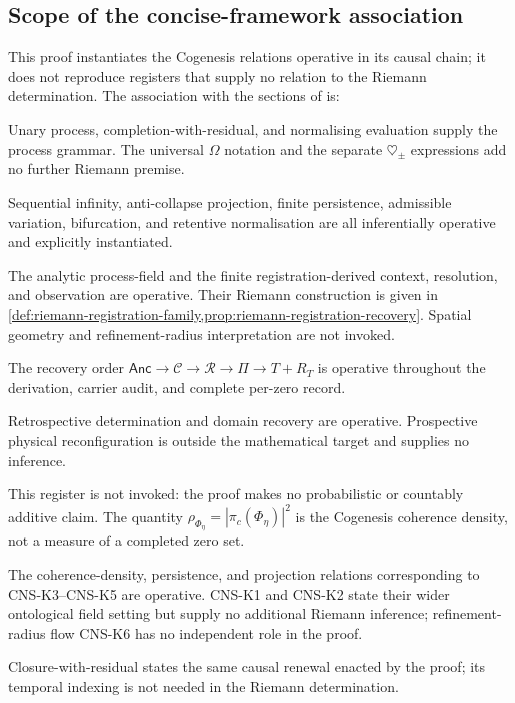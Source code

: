 \documentclass[11pt,a4paper]{article}
\theoremstyle{definition}
\newcommand{\Cctx}{\mathcal{C}}
\newcommand{\Rres}{\mathcal{R}}
\begin{document}
\subsection{Scope of the concise-framework association}
\label{sec:concise-framework-scope}

This proof instantiates the Cogenesis relations operative in its causal chain;
it does not reproduce registers that supply no relation to the Riemann
determination. The association with the sections of
\textcite{petrik2026concise} is:
\begin{description}[leftmargin=0pt,labelindent=0pt]
  \item[Core Process.]
  Unary process, completion-with-residual, and normalising evaluation supply
  the process grammar. The universal $\Omega$ notation and the separate
  $\heartsuit_\pm$ expressions add no further Riemann premise.

  \item[Sequential Resolution.]
  Sequential infinity, anti-collapse projection, finite persistence,
  admissible variation, bifurcation, and retentive normalisation are all
  inferentially operative and explicitly instantiated.

  \item[Field \& Singularity.]
  The analytic process-field and the finite registration-derived context,
  resolution, and observation are operative. Their Riemann construction is
  given in \cref{def:riemann-registration-family,prop:riemann-registration-recovery}.
  Spatial geometry and refinement-radius interpretation are not invoked.

  \item[Projection Discipline.]
  The recovery order
  $\mathsf{Anc}\to\Cctx\to\Rres\to\Pi\to T+R_T$ is operative throughout the
  derivation, carrier audit, and complete per-zero record.

  \item[Determination and Advancement.]
  Retrospective determination and domain recovery are operative. Prospective
  physical reconfiguration is outside the mathematical target and supplies no
  inference.

  \item[Relational Quantification and Measure.]
  This register is not invoked: the proof makes no probabilistic or
  countably additive claim. The quantity
  $\rho_{\Phi_\eta}=|\pi_c(\Phi_\eta)|^2$ is the Cogenesis coherence density,
  not a measure of a completed zero set.

  \item[Canonical Register.]
  The coherence-density, persistence, and projection relations corresponding
  to CNS-K3--CNS-K5 are operative. CNS-K1 and CNS-K2 state their wider
  ontological field setting but supply no additional Riemann inference;
  refinement-radius flow CNS-K6 has no independent role in the proof.

  \item[Causal Singularity of Now.]
  Closure-with-residual states the same causal renewal enacted by the proof;
  its temporal indexing is not needed in the Riemann determination.
\end{description}
\end{document}
